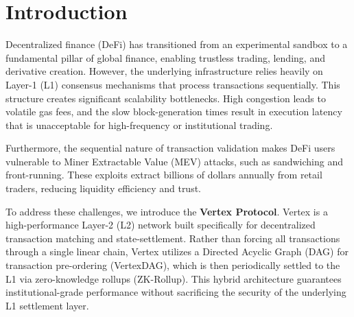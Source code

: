 \section{Introduction}
Decentralized finance (DeFi) has transitioned from an experimental sandbox to a fundamental pillar of global finance, enabling trustless trading, lending, and derivative creation. However, the underlying infrastructure relies heavily on Layer-1 (L1) consensus mechanisms that process transactions sequentially. This structure creates significant scalability bottlenecks. High congestion leads to volatile gas fees, and the slow block-generation times result in execution latency that is unacceptable for high-frequency or institutional trading.

Furthermore, the sequential nature of transaction validation makes DeFi users vulnerable to Miner Extractable Value (MEV) attacks, such as sandwiching and front-running. These exploits extract billions of dollars annually from retail traders, reducing liquidity efficiency and trust.

To address these challenges, we introduce the \textbf{Vertex Protocol}. Vertex is a high-performance Layer-2 (L2) network built specifically for decentralized transaction matching and state-settlement. Rather than forcing all transactions through a single linear chain, Vertex utilizes a Directed Acyclic Graph (DAG) for transaction pre-ordering (VertexDAG), which is then periodically settled to the L1 via zero-knowledge rollups (ZK-Rollup). This hybrid architecture guarantees institutional-grade performance without sacrificing the security of the underlying L1 settlement layer.
